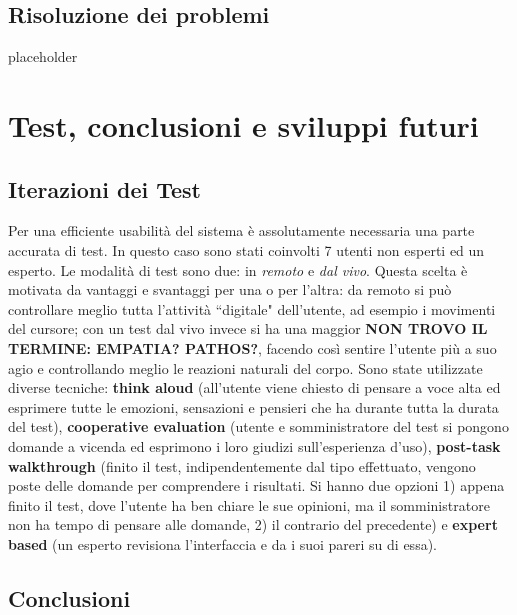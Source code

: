 \documentclass[a4paper,10pt]{memoir}
\begin{document}
\clearpage

\section{Risoluzione dei problemi}

placeholder

\clearpage


\chapter{Test, conclusioni e sviluppi futuri}

\section{Iterazioni dei Test}

Per una efficiente usabilità del sistema è assolutamente necessaria una parte accurata di test.
In questo caso sono stati coinvolti 7 utenti non esperti ed un esperto.
Le modalità di test sono due: in \textit{remoto} e \textit{dal vivo}. Questa scelta è motivata da vantaggi e svantaggi per una o per l'altra: da remoto si può controllare meglio tutta l'attività ``digitale" dell'utente, ad esempio i movimenti del cursore; con un test dal vivo invece si ha una maggior \textbf{NON TROVO IL TERMINE: EMPATIA? PATHOS?}, facendo così sentire l'utente più a suo agio e controllando meglio le reazioni naturali del corpo.
Sono state utilizzate diverse tecniche: \textbf{think aloud} (all'utente viene chiesto di pensare a voce alta ed esprimere tutte le emozioni, sensazioni e pensieri che ha durante tutta la durata del test), \textbf{cooperative evaluation} (utente e somministratore del test si pongono domande a vicenda ed esprimono i loro giudizi sull'esperienza d'uso), \textbf{post-task walkthrough} (finito il test, indipendentemente dal tipo effettuato, vengono poste delle domande per comprendere i risultati. Si hanno due opzioni 1) appena finito il test, dove l'utente ha ben chiare le sue opinioni, ma il somministratore non ha tempo di pensare alle domande, 2) il contrario del precedente) e \textbf{expert based} (un esperto revisiona l'interfaccia e da i suoi pareri su di essa).


\clearpage

\section{Conclusioni}
\end{document}
